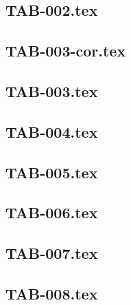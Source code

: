 \renewcommand{\xxexo}{TAB-002.tex} 
\subsection*{\xxexo} 
\graphicspath{{../../exostableaux/equadiffs/\xxexo/}}
 
 
\renewcommand{\xxexo}{TAB-003-cor.tex} 
\subsection*{\xxexo} 
\graphicspath{{../../exostableaux/equadiffs/\xxexo/}}
 
 
\renewcommand{\xxexo}{TAB-003.tex} 
\subsection*{\xxexo} 
\graphicspath{{../../exostableaux/equadiffs/\xxexo/}}
 
 
\renewcommand{\xxexo}{TAB-004.tex} 
\subsection*{\xxexo} 
\graphicspath{{../../exostableaux/equadiffs/\xxexo/}}
 
 
\renewcommand{\xxexo}{TAB-005.tex} 
\subsection*{\xxexo} 
\graphicspath{{../../exostableaux/equadiffs/\xxexo/}}
 
 
\renewcommand{\xxexo}{TAB-006.tex} 
\subsection*{\xxexo} 
\graphicspath{{../../exostableaux/equadiffs/\xxexo/}}
 
 
\renewcommand{\xxexo}{TAB-007.tex} 
\subsection*{\xxexo} 
\graphicspath{{../../exostableaux/equadiffs/\xxexo/}}
 
 
\renewcommand{\xxexo}{TAB-008.tex} 
\subsection*{\xxexo} 
\graphicspath{{../../exostableaux/equadiffs/\xxexo/}}
 
 
